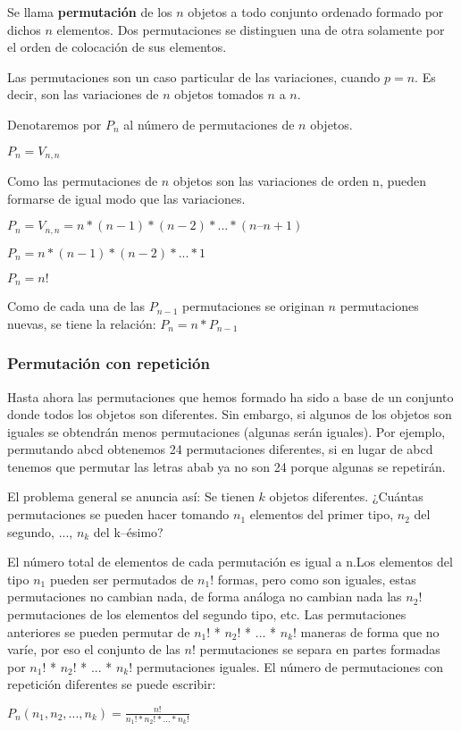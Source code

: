 Se llama {\bf permutación} de los $n$ objetos a todo conjunto ordenado formado por dichos $n$
elementos. Dos permutaciones se distinguen una de otra solamente por el orden de
colocación de sus elementos.

Las permutaciones son un caso particular de las variaciones, cuando $p = n$. Es decir,
son las variaciones de $n$ objetos tomados $n$ a $n$.

Denotaremos por $P_{n}$ al número de permutaciones de $n$ objetos.

$P_{n}=V_{n,n}$ 

Como las permutaciones de $n$ objetos son las variaciones de orden n, pueden formarse
de igual modo que las variaciones.


$P_{n}=V_{n,n}= n*(n-1)*(n-2)* ... * (n–n+1)$

$P_{n}=n*(n-1)*(n-2)* ... * 1$

$P_{n}=n!$

Como de cada una de las $P_{n-1}$ permutaciones se originan $n$ permutaciones nuevas, se
tiene la relación: $P_{n}=n*P_{n-1}$

\subsubsection{Permutación con repetición}
Hasta ahora las permutaciones que hemos formado ha sido a base de un conjunto donde
todos los objetos son diferentes. Sin embargo, si algunos de los objetos son iguales
se obtendrán menos permutaciones (algunas serán iguales). Por ejemplo, permutando
abcd obtenemos 24 permutaciones diferentes, si en lugar de abcd tenemos que permutar
las letras abab ya no son 24 porque algunas se repetirán.

El problema general se anuncia así: Se tienen $k$ objetos diferentes. ¿Cuántas permutaciones se pueden hacer tomando $n_{1} $ elementos del primer tipo, $n_{2}$ del segundo, ..., $n_{k}$ del k–ésimo?

El número total de elementos de cada permutación es igual a n.Los elementos del tipo $n_{1} $ pueden ser permutados de $n_{1}$! formas, pero como son iguales, estas permutaciones no cambian nada, de forma análoga no cambian nada las $n_{2} $! permutaciones de los elementos del segundo tipo, etc.
Las permutaciones anteriores se pueden permutar de $n_{1} $! * $n_{2}$! * ... * $n_{k} $! maneras de forma que no varíe, por eso el conjunto de las $n!$ permutaciones se separa en partes formadas por $n_{1} $! * $n_{2}$! * ... * $n_{k} $! permutaciones iguales. El número de permutaciones con repetición diferentes se puede escribir:

$P_{n}(n_{1},n_{2}, ...,n_{k})=\frac{n!}{n_{1}!*n_{2}!* ... * n_{k}! }$
